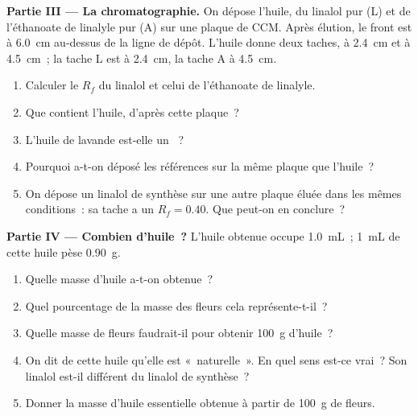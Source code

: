 \begin{problem}
\medskip
\noindent\textbf{Partie III --- La chromatographie.}
On dépose l'huile, du linalol pur (L) et de l'éthanoate de linalyle pur
(A) sur une plaque de CCM. Après élution, le front est à \qty{6.0}{cm}
au-dessus de la ligne de dépôt. L'huile donne deux taches, à
\qty{2.4}{cm} et à \qty{4.5}{cm}~; la tache L est à \qty{2.4}{cm}, la
tache A à \qty{4.5}{cm}.
\begin{enumerate}[resume]
  \item Calculer le $R_f$ du linalol et celui de l'éthanoate de linalyle.
  \item Que contient l'huile, d'après cette plaque~?
  \item L'huile de lavande est-elle un ~?
  \item Pourquoi a-t-on déposé les références sur la même plaque que
        l'huile~?
  \item On dépose un linalol de synthèse sur une autre plaque éluée dans
        les mêmes conditions~: sa tache a un $R_f = 0.40$. Que peut-on en
        conclure~?
\end{enumerate}

\medskip
\noindent\textbf{Partie IV --- Combien d'huile~?}
L'huile obtenue occupe \qty{1.0}{mL}~; \qty{1}{mL} de cette huile pèse
\qty{0.90}{g}.
\begin{enumerate}[resume]
  \item Quelle masse d'huile a-t-on obtenue~?
  \item Quel pourcentage de la masse des fleurs cela représente-t-il~?
  \item Quelle masse de fleurs faudrait-il pour obtenir \qty{100}{g}
        d'huile~?
  \item On dit de cette huile qu'elle est «~naturelle~». En quel sens
        est-ce vrai~? Son linalol est-il différent du linalol de
        synthèse~?
  \item Donner la masse d'huile essentielle obtenue à partir de
        \qty{100}{g} de fleurs.
\end{enumerate}
\end{problem}
